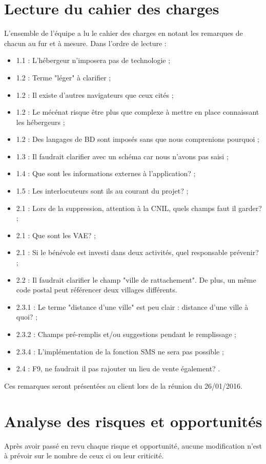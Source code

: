\documentclass [a4paper] {article}
\begin{document}
\section{Lecture du cahier des charges}
L'ensemble de l'équipe a lu le cahier des charges en notant les remarques de chacun au fur et à mesure. Dans l'ordre de lecture :
\begin{itemize}
\item 1.1 : L'hébergeur n'imposera pas de technologie ;
\item 1.2 : Terme "léger" à clarifier ;
\item 1.2 : Il existe d'autres navigateurs que ceux cités ;
\item 1.2 : Le mécénat risque être plus que complexe à mettre en place connaissant les hébergeurs ;
\item 1.2 : Des langages de BD sont imposés sans que nous comprenions pourquoi ;
\item 1.3 : Il faudrait clarifier avec un schéma car nous n'avons pas saisi ;
\item 1.4 : Que sont les informations externes à l'application? ;
\item 1.5 : Les interlocuteurs sont ils au courant du projet? ;
\item 2.1 : Lors de la suppression, attention à la CNIL, quels champs faut il garder? ;
\item 2.1 : Que sont les VAE? ;
\item 2.1 : Si le bénévole est investi dans deux activités, quel responsable prévenir? ;
\item 2.2 : Il faudrait clarifier le champ "ville de rattachement". De plus, un même code postal peut référencer deux villages différents.
\item 2.3.1 : Le terme "distance d'une ville" est peu clair : distance d'une ville à quoi? ;
\item 2.3.2 : Champs pré-remplis et/ou suggestions pendant le remplissage ;
\item 2.3.4 : L'implémentation de la fonction SMS ne sera pas possible ;
\item 2.4 : F9, ne faudrait il pas rajouter un lieu de vente également? .
\end{itemize}
Ces remarques seront présentées au client lors de la réunion du 26/01/2016.

\section{Analyse des risques et opportunités}
Après avoir passé en revu chaque risque et opportunité, aucune modification n'est à prévoir sur le nombre de ceux ci ou leur criticité.

\end{document}
